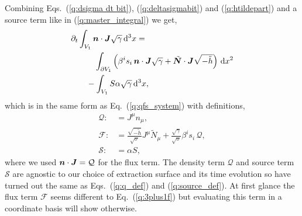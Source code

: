 Combining Eqs.~(\ref{q:dsigma dt bit}), (\ref{q:deltasigmabit}) and (\ref{q:htildepart}) and a source term like in (\ref{q:master_integral}) we get,
\begin{align}
 \partial_t &\int_{V_1} \boldsymbol{n} \cdot \boldsymbol{J} \sqrt{\gamma} \,\dd^3 x =\nonumber \\
 &\quad\quad\int_{\partial V_1} \left( \beta^i s_i\, \boldsymbol{n} \cdot \boldsymbol{J} \sqrt{\gamma}  + \tilde{\boldsymbol N} \cdot \boldsymbol{J} \sqrt{-\tilde{h}} \right) \, \dd x^2 \nonumber \\
 &\quad-\int_{V_1} S \alpha \sqrt{\gamma} \, \dd^3 x,
\end{align}
which is in the same form as Eq.~(\ref{q:qfs_system}) with definitions,
\begin{align}
\mathcal{Q} :&= J^\mu n_\mu, \\
\label{q:unfinished_flux}\mathcal{F} :&= \frac{\sqrt{-\tilde h}}{\sqrt{\sigma}}J^\mu \tilde N_\mu +  \frac{\sqrt{\gamma}}{\sqrt{\sigma}}\beta^i s_i\, \mathcal{Q} , \\
\mathcal{S} :&= \alpha S,
\end{align}
where we used $\boldsymbol{n} \cdot \boldsymbol{J} = \mathcal{Q}$ for the flux term. The density term $\mathcal{Q}$ and source term $\mathcal{S}$ are agnostic to our choice of extraction surface and its time evolution so have turned out the same as Eqs.~(\ref{q:q_def}) and (\ref{q:source_def}). At first glance the flux term $\mathcal{F}$ seems different to Eq.~(\ref{q:3plus1f}) but evaluating this term in a coordinate basis will show otherwise.


